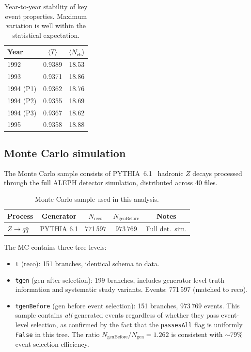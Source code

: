\documentclass[11pt,a4paper]{article}
\begin{document}
\begin{table}[htbp]
\centering
\caption{Year-to-year stability of key event properties.  Maximum
  variation is well within the statistical expectation.}
\label{tbl:year-stability}
\begin{tabular}{lcc}
\toprule
Year & $\langle T \rangle$ & $\langle N_\text{ch} \rangle$ \\
\midrule
1992 & 0.9389 & 18.53 \\
1993 & 0.9371 & 18.86 \\
1994 (P1) & 0.9362 & 18.76 \\
1994 (P2) & 0.9355 & 18.69 \\
1994 (P3) & 0.9367 & 18.62 \\
1995 & 0.9358 & 18.88 \\
\bottomrule
\end{tabular}
\end{table}

\subsection{Monte Carlo simulation}
\label{sec:data-mc}

The Monte Carlo sample consists of PYTHIA~6.1~\cite{Sjostrand:2000wi}
hadronic $Z$ decays processed through the full ALEPH detector
simulation, distributed across 40 files.

\begin{table}[htbp]
\centering
\caption{Monte Carlo sample used in this analysis.}
\label{tbl:mc}
\begin{tabular}{lcccc}
\toprule
Process & Generator & $N_\text{reco}$ & $N_\text{genBefore}$
  & Notes \\
\midrule
$Z \to q\bar{q}$ & PYTHIA 6.1 & 771\,597 & 973\,769
  & Full det.\ sim. \\
\bottomrule
\end{tabular}
\end{table}

The MC contains three tree levels:
\begin{itemize}
\item \texttt{t} (reco): 151 branches, identical schema to data.
\item \texttt{tgen} (gen after selection): 199 branches, includes
  generator-level truth information and systematic study variants.
  Events: 771\,597 (matched to reco).
\item \texttt{tgenBefore} (gen before event selection): 151 branches,
  973\,769 events.  This sample contains \emph{all} generated events
  regardless of whether they pass event-level selection, as confirmed by
  the fact that the \texttt{passesAll} flag is uniformly \texttt{False}
  in this tree.  The ratio $N_\text{genBefore}/N_\text{gen} = 1.262$
  is consistent with $\sim\!79\%$ event selection efficiency.
\end{itemize}
\end{document}
